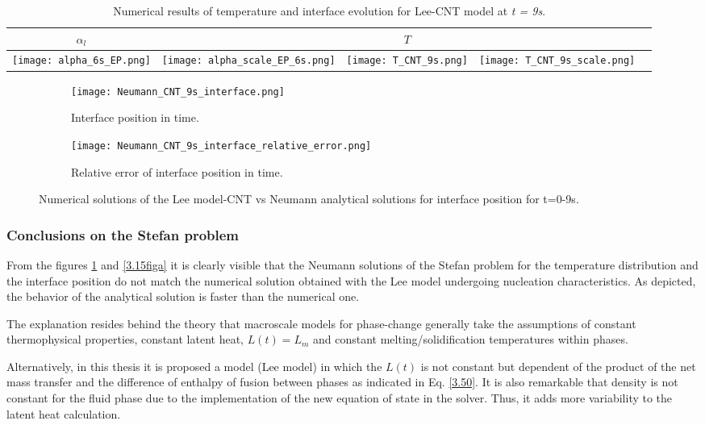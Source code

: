 \begin{table}[h!]
	\begin{tabular}{@{}lllll@{}}
		\toprule[1pt]
		\multicolumn{1}{c}{\textbf{$\alpha_{l}$}}& & \multicolumn{1}{c}{\textbf{$T$}} & \\ \midrule[2pt] 
		\texttt{[image: alpha\_6s\_EP.png]} & \texttt{[image: alpha\_scale\_EP\_6s.png]} & \texttt{[image: T\_CNT\_9s.png]} & \texttt{[image: T\_CNT\_9s\_scale.png]}\\ \bottomrule[1pt]		
	\end{tabular}
	\centering
	\caption{Numerical results of temperature and interface evolution for Lee-CNT model at \textit{t = 9s}.}	
	\label{3.20tab}
\end{table}
\begin{figure}[h!]
	\begin{subfigure}{0.50\textwidth}
		\texttt{[image: Neumann\_CNT\_9s\_interface.png]}\hfill
		\caption{Interface position in time.}\label{3.16figa}
	\end{subfigure}
	\begin{subfigure}{0.50\textwidth}
		\texttt{[image: Neumann\_CNT\_9s\_interface\_relative\_error.png]}	
		\caption{Relative error of interface position in time.}\label{3.16figb}
	\end{subfigure}
	\caption{Numerical solutions of the Lee model-CNT vs Neumann analytical solutions for interface position for t=0-9s.}
\label{3.16fig}
\end{figure}

\subsubsection{Conclusions on the Stefan problem}
From the figures \ref{3.16figa} and \ref{3.15figa} it is clearly visible that the Neumann solutions of the Stefan problem for the temperature distribution and the interface position do not match the numerical solution obtained with the Lee model undergoing nucleation characteristics. As depicted, the behavior of the analytical solution is faster than the numerical one. 
 
\noindent The explanation resides behind the theory that macroscale models for phase-change generally take the assumptions of constant thermophysical properties, constant latent heat, $L(t) = L_{m}$ and constant melting/solidification temperatures within phases. 

\noindent Alternatively, in this thesis it is proposed a model (Lee model) in which the $L(t)$ is not constant but dependent of the product of the net mass transfer and the difference of enthalpy of fusion between phases as indicated in Eq. \ref{3.50}. It is also remarkable that density is not constant for the fluid phase due to the implementation of the new equation of state in the solver. Thus, it adds more variability to the latent heat calculation.

